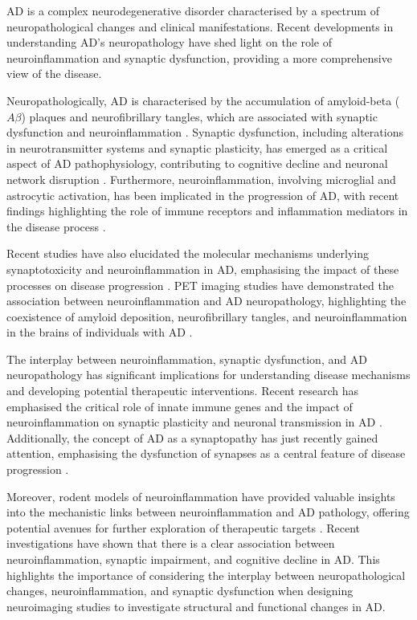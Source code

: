 \documentclass[10pt]{article}
\begin{document}
\begin{sloppypar}
  AD is a complex neurodegenerative disorder characterised by a spectrum of neuropathological changes and clinical manifestations. Recent developments in understanding AD's neuropathology have shed light on the role of neuroinflammation and synaptic dysfunction, providing a more comprehensive view of the disease.

  Neuropathologically, AD is characterised by the accumulation of amyloid-beta ($A\beta$) plaques and neurofibrillary tangles, which are associated with synaptic dysfunction and neuroinflammation \citep{marcello_synaptic_2012}. Synaptic dysfunction, including alterations in neurotransmitter systems and synaptic plasticity, has emerged as a critical aspect of AD pathophysiology, contributing to cognitive decline and neuronal network disruption \citep{marcello_synaptic_2012}. Furthermore, neuroinflammation, involving microglial and astrocytic activation, has been implicated in the progression of AD, with recent findings highlighting the role of immune receptors and inflammation mediators in the disease process \citep{heneka_neuroinflammation_2015}.

  Recent studies have also elucidated the molecular mechanisms underlying synaptotoxicity and neuroinflammation in AD, emphasising the impact of these processes on disease progression \citep{marttinen_molecular_2018}. PET imaging studies have demonstrated the association between neuroinflammation and AD neuropathology, highlighting the coexistence of amyloid deposition, neurofibrillary tangles, and neuroinflammation in the brains of individuals with AD \citep{zhou_pet_2021}.

  The interplay between neuroinflammation, synaptic dysfunction, and AD neuropathology has significant implications for understanding disease mechanisms and developing potential therapeutic interventions. Recent research has emphasised the critical role of innate immune genes and the impact of neuroinflammation on synaptic plasticity and neuronal transmission in AD \citep{ransohoff_how_2016}. Additionally, the concept of AD as a synaptopathy has just recently gained attention, emphasising the dysfunction of synapses as a central feature of disease progression \citep{meftah_alzheimers_2023}.

  Moreover, rodent models of neuroinflammation have provided valuable insights into the mechanistic links between neuroinflammation and AD pathology, offering potential avenues for further exploration of therapeutic targets \citep{nazem_rodent_2015}. Recent investigations have shown that there is a clear association between neuroinflammation, synaptic impairment, and cognitive decline in AD. This highlights the importance of considering the interplay between neuropathological changes, neuroinflammation, and synaptic dysfunction when designing neuroimaging studies to investigate structural and functional changes in AD.


\end{sloppypar}
\end{document}
